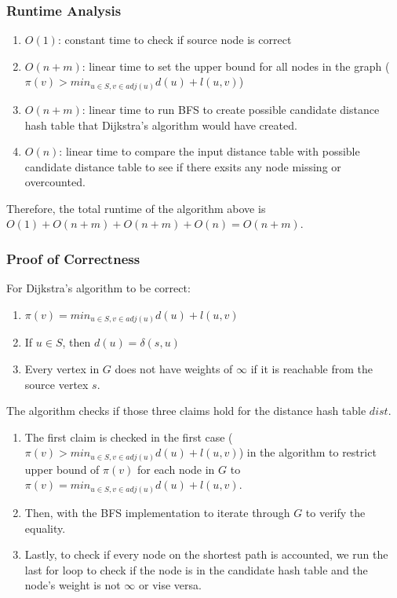 \documentclass[11pt]{article}
\begin{document}
\subsubsection{Runtime Analysis}
\begin{enumerate}[label=\arabic*.]
    \item $O(1)$: constant time to check if source node is correct
    \item $O(n+m)$: linear time to set the upper bound for all nodes in the graph ($\pi(v) > min_{u \in S, v \in adj(u)} d(u) + l(u,v)$)
    \item $O(n+m)$: linear time to run BFS to create possible candidate distance hash table that Dijkstra's algorithm would have created.
    \item $O(n)$: linear time to compare the input distance table with possible candidate distance table to see if there exsits any node missing or overcounted.
\end{enumerate}
Therefore, the total runtime of the algorithm above is $O(1) + O(n+m) + O(n+m) + O(n) = O(n+m)$.

\subsubsection{Proof of Correctness}
For Dijkstra's algorithm to be correct:
\begin{enumerate}
\item $\pi(v) = min_{u \in S, v \in adj(u)} d(u) + l(u,v)$
\item If $u \in S$, then $d(u) = \delta(s,u)$
\item Every vertex in $G$ does not have weights of $\infty$ if it is reachable from the source vertex $s$.
\end{enumerate}

The algorithm checks if those three claims hold for the distance hash table $dist$.

\begin{enumerate}
\item The first claim is checked in the first case ($\pi(v) > min_{u \in S, v \in adj(u)} d(u) + l(u,v)$) in the algorithm to restrict upper bound of $\pi(v)$ for each node in $G$ to $\pi(v) = min_{u \in S, v \in adj(u)} d(u) + l(u,v)$.
\item Then, with the BFS implementation to iterate through $G$ to verify the equality.
\item Lastly, to check if every node on the shortest path is accounted, we run the last for loop to check if the node is in the candidate hash table and the node's weight is not $\infty$ or vise versa. 
\end{enumerate}
\end{document}
